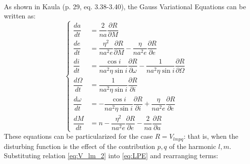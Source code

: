 				\paragraph{ \\ }
				\indent As shown in Kaula \cite{Kaula} (p. 29, eq. 3.38-3.40), the Gauss Variational Equations can be written as:
				\begin{equation}
				\left\{ \begin{array}{llll}
				\dfrac{da}{dt} 		& = \dfrac{2}{na} \dfrac{ \partial R}{\partial M} \\[1.2 em]
				\dfrac{de}{dt} 		& = \dfrac{\eta^2}{na^2 e} \dfrac{ \partial R}{\partial M} - \dfrac{\eta}{na^2e} \dfrac{\partial R}{\partial e} \\[1.2 em]
				\dfrac{di}{dt} 		& = \dfrac{\cos i}{na^2 \eta \sin i} \dfrac{ \partial R}{\partial \omega} - \dfrac{1}{na^2 \eta \sin i} \dfrac{\partial R}{\partial \Omega} \\[1.2 em]
				\dfrac{d\Omega}{dt} & = \dfrac{1}{na^2 \eta \sin i} \dfrac{ \partial R}{\partial i} \\[1.2 em]
				\dfrac{d\omega}{dt} & = -\dfrac{\cos i}{na^2 \eta \sin i} \dfrac{ \partial R}{\partial i} + \dfrac{\eta}{na^2  e} \dfrac{\partial R}{\partial e}\\[1.2 em]
				\dfrac{dM}{dt}		& = n - \dfrac{\eta^2}{n a^2 e}\dfrac{\partial R}{\partial e} - \dfrac{2}{na} \dfrac{\partial R}{\partial a}
				\end{array}\right.
				\label{eq:LPE}
				\end{equation}
				\indent These equations can be particularized for the case $R = V_{lmpq}$: that is, when the disturbing function is the effect of the contribution $p, q$ of the harmonic $l, m$. Substituting relation \eqref{eq:V_lm_2} into \eqref{eq:LPE} and rearranging terms:
